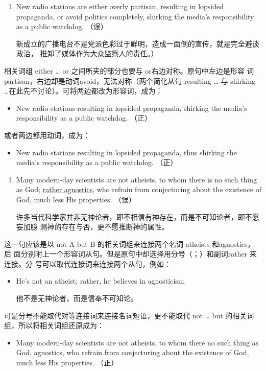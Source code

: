 \begin{enumerate}[resume]
\item New radio stations are either overly partisan, resulting in lopsided
  propaganda, or avoid politics completely, shirking the media's
  responsibility as a public watchdog. （误）

  新成立的广播电台不是党派色彩过于鲜明，造成一面倒的宣传，就是完全避谈政治，
  推卸了媒体作为大众监察人的责任。）
\end{enumerate}

相关词组 either \ldots{} or 之间所夹的部分也要与 or右边对称。原句中左边是形容
词 partisan，右边却是动词avoid，无法对称（两个简化从句 resulting
\ldots{} 与 shirking \ldots{}在此先不讨论）。可将两边都改为形容词，成为：
\begin{mybox}
\begin{itemize}
\item New radio stations  resulting in lopsided
  propaganda,  shirking the media's responsibility
  as a public watchdog. （正）
\end{itemize}
\end{mybox}
或者两边都用动词，成为：
\begin{mybox}
\begin{itemize}
\item New radio stations  resulting in
  lopsided propaganda,  thus shirking the
  media's responsibility as a public watchdog. （正）
\end{itemize}
\end{mybox}


\begin{enumerate}[resume]
\item Many modern-day scientists are not atheists, to whom there is no such
  thing as God; \ul{rather agnostics}, who refrain from conjecturing about the
  existence of God, much less His properties. （误）

  许多当代科学家并非无神论者，即不相信有神存在，而是不可知论者，即不愿妄加臆
  测神的存在与否，更不愿推断神的属性。
\end{enumerate}
这一句应该是以 not A but B 的相关词组来连接两个名词 atheists 和agnostics，后
面分别附上一个形容词从句。但是原句中却选择用分号（；）和副词rather 来连接。分
号可以取代连接词来连接两个从句，例如：
\begin{itemize}
\item He's not an atheist; rather, he believes in agnosticism.

  他不是无神论者，而是信奉不可知论。
\end{itemize}
可是分号不能取代对等连接词来连接名词短语，更不能取代 not \ldots{} but
的相关词组，所以将相关词组还原成为：
\begin{itemize}
\item Many modern-day scientists are not atheists, to whom there no such thing
  as God,  agnostics, who refrain from conjecturing about the existence
  of God, much less His properties. （正）
\end{itemize}

